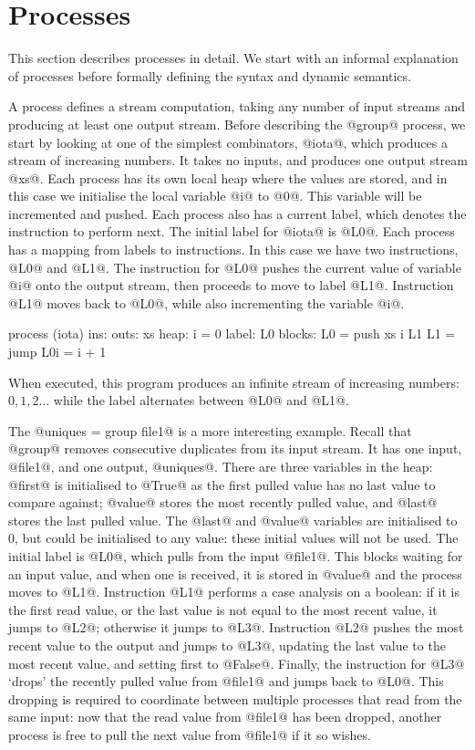 \section{Processes}
\label{s:Processes}

This section describes processes in detail.
We start with an informal explanation of processes before formally defining the syntax and dynamic semantics.

A process defines a stream computation, taking any number of input streams and producing at least one output stream.
Before describing the @group@ process, we start by looking at one of the simplest combinators, @iota@, which produces a stream of increasing numbers.
It takes no inputs, and produces one output stream @xs@.
Each process has its own local heap where the values are stored, and in this case we initialise the local variable @i@ to @0@.
This variable will be incremented and pushed.
Each process also has a current label, which denotes the instruction to perform next.
The initial label for @iota@ is @L0@.
Each process has a mapping from labels to instructions.
In this case we have two instructions, @L0@ and @L1@.
The instruction for @L0@ pushes the current value of variable @i@ onto the output stream, then proceeds to move to label @L1@.
Instruction @L1@ moves back to @L0@, while also incrementing the variable @i@.

\begin{code}
process (iota)
     ins: 
    outs: xs
    heap: {i = 0}
   label: L0
  blocks: L0 = push xs i  L1
          L1 = jump       L0{i = i + 1}
\end{code}

When executed, this program produces an infinite stream of increasing numbers: $0, 1, 2\ldots$ while the label alternates between @L0@ and @L1@.

The @uniques = group file1@ is a more interesting example.
Recall that @group@ removes consecutive duplicates from its input stream.
It has one input, @file1@, and one output, @uniques@.
There are three variables in the heap: @first@ is initialised to @True@ as the first pulled value has no last value to compare against; @value@ stores the most recently pulled value, and @last@ stores the last pulled value.
The @last@ and @value@ variables are initialised to $0$, but could be initialised to any value: these initial values will not be used.
The initial label is @L0@, which pulls from the input @file1@. This blocks waiting for an input value, and when one is received, it is stored in @value@ and the process moves to @L1@.
Instruction @L1@ performs a case analysis on a boolean: if it is the first read value, or the last value is not equal to the most recent value, it jumps to @L2@; otherwise it jumps to @L3@.
Instruction @L2@ pushes the most recent value to the output and jumps to @L3@, updating the last value to the most recent value, and setting first to @False@.
Finally, the instruction for @L3@ `drops' the recently pulled value from @file1@ and jumps back to @L0@.
This dropping is required to coordinate between multiple processes that read from the same input: now that the read value from @file1@ has been dropped, another process is free to pull the next value from @file1@ if it so wishes.

